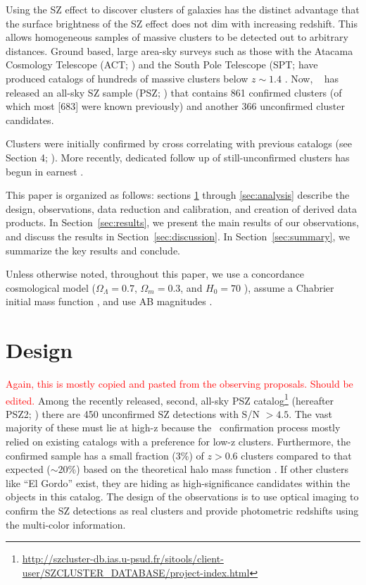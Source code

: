 \documentclass[apj, revtex4-1]{emulateapj}
\newcommand{\editorial}[1]{\textcolor{red}{#1}}
\begin{document}
Using the SZ effect to discover clusters of galaxies has the distinct advantage that the surface brightness of the SZ effect does not dim with increasing redshift. This allows homogeneous samples of massive clusters to be detected out to arbitrary distances. Ground based, large area-sky surveys such as those with the Atacama Cosmology Telescope (ACT; \citealt{Swetz2011}) and the South Pole Telescope (SPT; \citealt{Carlstrom2011} have produced catalogs of hundreds of massive clusters below $z \sim 1.4$ . Now, \planck\ \citep{Tauber2010, PlanckCollaboration2011} has released an all-sky SZ sample (PSZ; \citealt{PlanckCollaboration2014, PlanckCollaboration2015}) that contains 861 confirmed clusters (of which most [683] were known previously) and another 366 unconfirmed cluster candidates.

Clusters were initially confirmed by cross correlating with previous catalogs (see Section 4; \citealt{PlanckCollaboration2014}). More recently, dedicated follow up of still-unconfirmed clusters has begun in earnest .

This paper is organized as follows: sections \ref{sec:design} through \ref{sec:analysis} describe the design, observations, data reduction and calibration, and creation of derived data products. In Section~\ref{sec:results}, we present the main results of our observations, and discuss the results in Section~\ref{sec:discussion}. In Section~\ref{sec:summary}, we summarize the key results and conclude.

Unless otherwise noted, throughout this paper, we use a concordance cosmological model ($\Omega_\Lambda = 0.7$, $\Omega_m = 0.3$, and $H_0= 70$ \kms \mpc), assume a Chabrier initial mass function \citep{Chabrier2003}, and use AB magnitudes \citep{Oke1974}.

\section{Design}\label{sec:design}
\editorial{Again, this is mostly copied and pasted from the observing proposals. Should be edited.}
Among the recently released, second, all-sky PSZ catalog\footnote{\hbox{\url{http://szcluster-db.ias.u-psud.fr/sitools/client-user/SZCLUSTER_DATABASE/project-index.html}}} (hereafter PSZ2; \citealt{PlanckCollaboration2015}) there are 450 unconfirmed SZ detections with S/N $> 4.5$. The vast majority of these must lie at high-z because the \planck\ confirmation process \citep{PlanckCollaboration2014} mostly relied on existing catalogs with a preference for low-z clusters. Furthermore, the confirmed sample has a small fraction (3\%) of $z > 0.6$ clusters compared to that expected ($\sim20$\%) based on the theoretical halo mass function . If other clusters like ``El Gordo'' exist, they are hiding as high-significance candidates within the objects in this catalog. The design of the observations is to use optical imaging to confirm the SZ detections as real clusters and provide photometric redshifts using the multi-color information.
\end{document}
